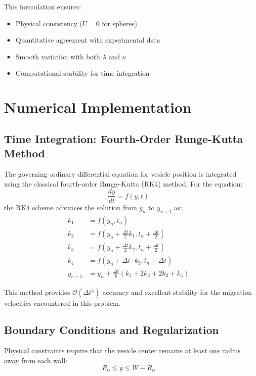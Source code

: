 \documentclass{article}
\begin{document}
This formulation ensures:
\begin{itemize}
    \item Physical consistency ($U = 0$ for spheres)
    \item Quantitative agreement with experimental data
    \item Smooth variation with both $\lambda$ and $\nu$
    \item Computational stability for time integration
\end{itemize}

\section{Numerical Implementation}

\subsection{Time Integration: Fourth-Order Runge-Kutta Method}

The governing ordinary differential equation for vesicle position is integrated using the classical fourth-order Runge-Kutta (RK4) method. For the equation:
\begin{equation}
    \frac{dy}{dt} = f(y, t)
\end{equation}
the RK4 scheme advances the solution from $y_n$ to $y_{n+1}$ as:
\begin{align}
    k_1 &= f(y_n, t_n) \\
    k_2 &= f\left(y_n + \frac{\Delta t}{2} k_1, t_n + \frac{\Delta t}{2}\right) \\
    k_3 &= f\left(y_n + \frac{\Delta t}{2} k_2, t_n + \frac{\Delta t}{2}\right) \\
    k_4 &= f\left(y_n + \Delta t \cdot k_3, t_n + \Delta t\right) \\
    y_{n+1} &= y_n + \frac{\Delta t}{6}\left(k_1 + 2k_2 + 2k_3 + k_4\right)
    \label{eq:rk4}
\end{align}

This method provides $\mathcal{O}(\Delta t^4)$ accuracy and excellent stability for the migration velocities encountered in this problem.

\subsection{Boundary Conditions and Regularization}

Physical constraints require that the vesicle center remains at least one radius away from each wall:
\begin{equation}
    R_0 \leq y \leq W - R_0
\end{equation}
\end{document}
